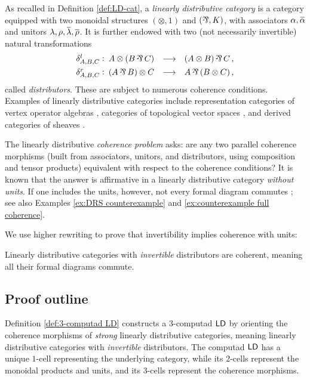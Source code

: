 \documentclass[reqno,12pt]{amsart}
\begin{document}
As recalled in Definition \ref{def:LD-cat}, a \emph{linearly distributive category} \cite{CS97} is a category equipped with two monoidal structures $(\otimes,1)$ and $(\partimes,K)$, with associators $\ao,\ap$ and unitors $\lo,\ro,\lp,\rp$. It is further endowed with two (not necessarily invertible) natural transformations
\begin{equation*}\begin{array}{lll}
		\distl_{A,B,C}:\: A\ot(B \prt C) & \longrightarrow &{(A \ot B)} \prt {C}\,,\\[0.4em]
		\distr_{A,B,C}:\: {(A \prt B)} \ot C & \longrightarrow &A \prt{(B \ot C)}\,,
	\end{array} \label{eq:distributors}
\end{equation*} 
 called \emph{distributors}. These are subject to numerous coherence conditions. Examples of linearly distributive categories include representation categories of vertex operator algebras \cite{ALSW25}, categories of topological vector spaces \cite{Ba00}, and derived categories of sheaves \cite{BoD13}. 

The linearly distributive \emph{coherence problem} asks: are any two parallel coherence morphisms (built from associators, unitors, and distributors, using composition and tensor products) equivalent with respect to the coherence conditions? It is known \cite{DP07, DRS26} that the answer is affirmative in a linearly distributive category \emph{without units}. If one includes the units, however, not every formal diagram commutes \cite{BCST96}; see also Examples \ref{ex:DRS counterexample} and \ref{ex:counterexample full coherence}. 

We use higher rewriting to prove that invertibility implies coherence with units:

\begin{maintheorem*}
	Linearly distributive categories with \emph{invertible} distributors are coherent, meaning all their formal diagrams commute.
\end{maintheorem*}

\subsection{Proof outline}
Definition \ref{def:3-computad LD} constructs a $3$-computad $\mathsf{LD}$ by orienting the coherence morphisms of \emph{strong} linearly distributive categories, meaning linearly distributive categories with \emph{invertible} distributors. The computad $\mathsf{LD}$ has a unique $1$-cell representing the underlying category, while its $2$-cells represent the monoidal products and units, and its $3$-cells represent the coherence morphisms. 
\end{document}
